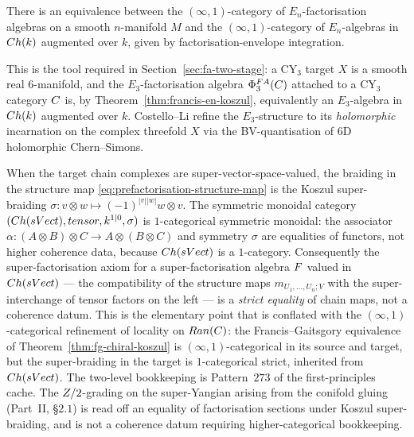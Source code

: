 \begin{theorem}
\label{thm:francis-en-koszul}
There is an equivalence between the $(\infty, 1)$-category of
$E_n$-factorisation algebras on a smooth $n$-manifold $M$ and the
$(\infty, 1)$-category of $E_n$-algebras in $Ch(k)$ augmented over
$k$, given by factorisation-envelope integration.
\end{theorem}

This is the tool required in Section~\ref{sec:fa-two-stage}: a CY$_3$
target $X$ is a smooth real $6$-manifold, and the $E_3$-factorisation
algebra $\Phi^{FA}_3(C)$ attached to a CY$_3$ category $C$ is,
by Theorem~\ref{thm:francis-en-koszul}, equivalently an $E_3$-algebra
in $Ch(k)$ augmented over $k$. Costello--Li
\cite{CostelloLi2016,CostelloLi2020} refine the $E_3$-structure to its
\emph{holomorphic} incarnation on the complex threefold $X$ via the
BV-quantisation of 6D holomorphic Chern--Simons.

\begin{remark}
\label{rem:strict-super-factorisation}
When the target chain complexes are super-vector-space-valued, the
braiding in the structure map
\eqref{eq:prefactorisation-structure-map} is the Koszul super-braiding
$\sigma \colon v \otimes w \mapsto (-1)^{|v||w|} w \otimes v$. The
symmetric monoidal category $(Ch(sVect), tensor, k^{1|0}, \sigma)$
is $1$-categorical symmetric monoidal: the associator
$\alpha \colon (A \otimes B) \otimes C \to A \otimes (B \otimes C)$ and
symmetry $\sigma$ are equalities of functors, not higher coherence
data, because $Ch(sVect)$ is a $1$-category. Consequently the
super-factorisation axiom for a super-factorisation algebra $F$
valued in $Ch(sVect)$ --- the compatibility of the structure maps
$m_{U_1, \ldots, U_n; V}$ with the super-interchange of tensor factors
on the left --- is a \emph{strict equality} of chain maps, not a
coherence datum. This is the elementary point that is conflated with
the $(\infty, 1)$-categorical refinement of locality on $Ran(C)$: the
Francis--Gaitsgory equivalence of
Theorem~\ref{thm:fg-chiral-koszul} is $(\infty, 1)$-categorical in its
source and target, but the super-braiding in the target is
$1$-categorical strict, inherited from $Ch(sVect)$. The two-level
bookkeeping is Pattern~$273$ of the first-principles cache.
The $Z/2$-grading on the super-Yangian arising from the conifold
gluing (Part~II, \S$2.1$) is read off an equality of factorisation
sections under Koszul super-braiding, and is not a coherence datum
requiring higher-categorical bookkeeping.
\end{remark}

